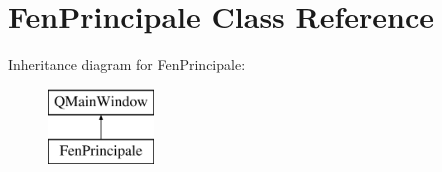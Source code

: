 \hypertarget{class_fen_principale}{}\section{Fen\+Principale Class Reference}
\label{class_fen_principale}
Inheritance diagram for Fen\+Principale\+:\begin{figure}[H]
\begin{center}
\leavevmode
\includegraphics[height=2.000000cm]{class_fen_principale}
\end{center}
\end{figure}
